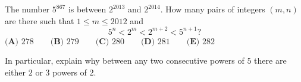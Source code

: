 The number $5^{867}$ is between $2^{2013}$ and $2^{2014}$. How many pairs of integers $(m,n)$ are there such that $1\le m\le2012$ and
\[
5^n<2^m<2^{m+2}<5^{n+1}?
\]
$\textbf{(A) }278\qquad\textbf{(B) }279\qquad\textbf{(C) }280\qquad\textbf{(D) }281\qquad\textbf{(E) }282$

In particular, explain why between any two consecutive powers of $5$ there are either $2$ or $3$ powers of $2$.
